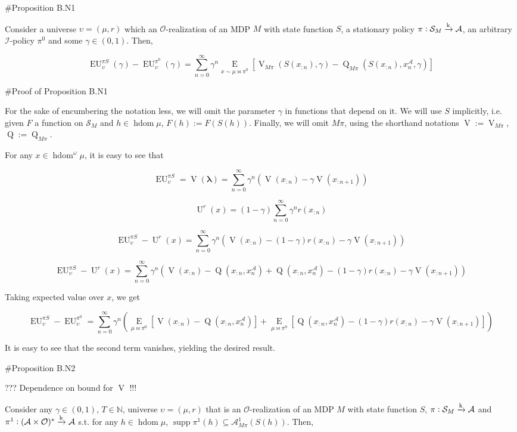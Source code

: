 \documentclass[a4paper]{article}
\DeclareMathOperator{\Supp}{supp}
\newcommand{\AP}[1]{\left(#1\right)}
\newcommand{\AB}[1]{\left[#1\right]}
\newcommand{\Ea}[2]{\underset{#1}{\operatorname{E}}\AB{#2}}
\newcommand{\Nats}{\mathbb{N}}
\newcommand{\Estr}{\boldsymbol{\lambda}}
\newcommand{\M}{\xrightarrow{\textnormal{k}}}
\newcommand{\Ob}{\mathcal{O}}
\newcommand{\A}{\mathcal{A}}
\newcommand{\St}{\mathcal{S}}
\newcommand{\In}{\mathcal{I}}
\newcommand{\FH}{(\A \times \Ob)^*}
\DeclareMathOperator{\HD}{hdom}
\newcommand{\Ut}{\operatorname{U}}
\newcommand{\V}{\operatorname{V}}
\newcommand{\Q}{\operatorname{Q}}
\newcommand{\EU}{\operatorname{EU}}
\begin{document}
\#Proposition B.N1

Consider a universe $\upsilon=(\mu,r)$ which an $\Ob$-realization of an MDP $M$ with state function $S$, a stationary policy $\pi: \St_M \M \A$, an arbitrary $\In$-policy $\pi^0$ and some $\gamma \in (0,1)$. Then,

$$\EU_{\upsilon}^{\pi S}(\gamma) - \EU_{\upsilon}^{\pi^0}(\gamma)=\sum_{n=0}^\infty {\gamma^n \Ea{x\sim\mu\bowtie\pi^0}{\V_{M\pi}\AP{S\AP{x_{:n}},\gamma}-\Q_{M\pi}\AP{S\AP{x_{:n}},x_n^\A,\gamma}}}$$

\#Proof of Proposition B.N1

For the sake of encumbering the notation less, we will omit the parameter $\gamma$ in functions that depend on it. We will use $S$ implicitly, i.e. given $F$ a function on $\St_M$ and $h \in \HD{\mu}$, $F(h):=F\AP{S(h)}$. Finally, we will omit $M\pi$, using the shorthand notations $\V:=\V_{M\pi}$, $\Q:=\Q_{M\pi}$.

For any $x \in \HD^\omega \mu$, it is easy to see that

$$\EU_{\upsilon}^{\pi S}=\V\AP{\Estr}=\sum_{n=0}^\infty \gamma^n \AP{\V\AP{x_{:n}}-\gamma\V\AP{x_{:n+1}}}$$

$$\Ut^{r}(x)=(1-\gamma)\sum_{n=0}^\infty \gamma^n r\AP{x_{:n}}$$

$$\EU_{\upsilon}^{\pi S} - \Ut^{r}(x)=\sum_{n=0}^\infty \gamma^n \AP{\V\AP{x_{:n}}-(1-\gamma)r\AP{x_{:n}}-\gamma\V\AP{x_{:n+1}}}$$

$$\EU_{\upsilon}^{\pi S} - \Ut^{r}(x)=\sum_{n=0}^\infty \gamma^n \AP{\V\AP{x_{:n}}-\Q\AP{x_{:n},x_n^\A}+\Q\AP{x_{:n},x_n^\A}-(1-\gamma)r\AP{x_{:n}}-\gamma\V\AP{x_{:n+1}}}$$

Taking expected value over $x$, we get

$$\EU_{\upsilon}^{\pi S} - \EU_{\upsilon}^{\pi^0}=\sum_{n=0}^\infty \gamma^n \AP{\Ea{\mu\bowtie\pi^0}{\V\AP{x_{:n}}-\Q\AP{x_{:n},x_n^\A}}+\Ea{\mu\bowtie\pi^0}{\Q\AP{x_{:n},x_n^\A}-(1-\gamma)r\AP{x_{:n}}-\gamma\V\AP{x_{:n+1}}}}$$

It is easy to see that the second term vanishes, yielding the desired result.

\#Proposition B.N2

??? Dependence on bound for $\V$ !!!

Consider any $\gamma\in(0,1)$, $T \in \Nats$, universe $\upsilon=(\mu,r)$ that is an $\Ob$-realization of an MDP $M$ with state function $S$, $\pi: \St_M \M \A$ and $\pi^1: \FH \M \A$ s.t. for any $h \in \HD{\mu}$, $\Supp{\pi^1(h)} \subseteq \A_{M\pi}^1\AP{S(h)}$. Then,
\end{document}
